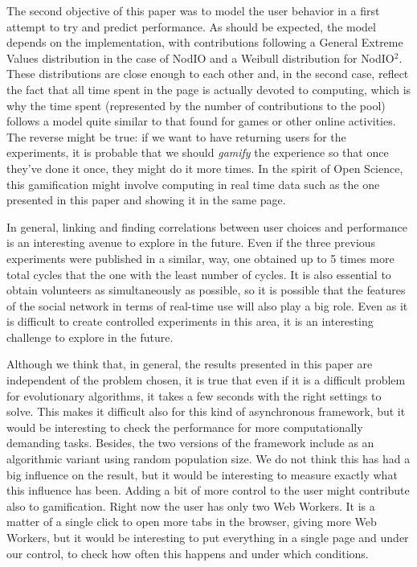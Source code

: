 \documentclass[journal,onecolumn]{IEEEtran}
\begin{document}
The second objective of this paper was to model the user behavior in a
first attempt to try and predict performance. As should be expected,
the model depends on the implementation, with contributions following
a General Extreme Values distribution in the case of {\sf NodIO} and a
Weibull distribution for {\sf NodIO$^2$}. These distributions are
close enough to each other and, in the second case, reflect the fact
that all time spent in the page is actually devoted to computing,
which is why the time spent (represented by the number of
contributions to the pool) follows a model quite similar to that found
for games or other online activities. The reverse might be true: if we
want to have returning users for the experiments, it is probable that
we should {\em gamify} the experience so that once they've done it
once, they might do it more times. In the spirit of Open Science, this
gamification might involve computing in real time data such as the one
presented in this paper and showing it in the same page. 

In general, linking and finding correlations between user choices and
performance is an interesting avenue to explore in the future. Even if
the three previous experiments were published in a similar, way, one
obtained up to 5 times more total cycles  that the one with the least
number of cycles. It is also essential to obtain volunteers as
simultaneously as possible, so it is possible that the features of the
social network in terms of real-time use will also play a big
role. Even as it is difficult to create controlled experiments in this
area, it is an interesting challenge to explore in the future.

Although we think that, in general, the results presented in this
paper are independent of the problem chosen, it is true that even if
it is a difficult problem for evolutionary algorithms, it takes a few
seconds with the right settings to solve. This makes it difficult also
for this kind of asynchronous framework, but it would be interesting
to check the performance for more computationally demanding
tasks. Besides, the two versions of the framework include as an
algorithmic variant using random population size. We do not think this
has had a big influence on the result, but it would be interesting to
measure exactly what this influence has been. Adding a bit of more
control to the user might contribute also to gamification. Right now
the user has only two Web Workers. It is a matter of a single click to
open more tabs in the browser, giving more Web Workers, but it would be
interesting to put everything in a single page and under our control,
to check how often this happens and under which conditions. 
\end{document}
